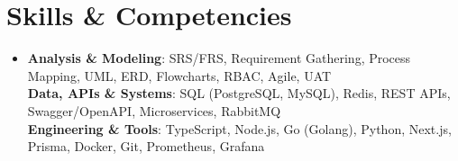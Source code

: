 \documentclass[letterpaper,11pt]{article}
\begin{document}
\section{Skills \& Competencies}
  \begin{itemize}[leftmargin=0in, label={}, itemsep=0.3pt, parsep=0pt, topsep=0.1pt]
    \item\small{
      \textbf{Analysis \& Modeling}{: SRS/FRS, Requirement Gathering, Process Mapping, UML, ERD, Flowcharts, RBAC, Agile, UAT} \\
      \textbf{Data, APIs \& Systems}{: SQL (PostgreSQL, MySQL), Redis, REST APIs, Swagger/OpenAPI, Microservices, RabbitMQ} \\
      \textbf{Engineering \& Tools}{: TypeScript, Node.js, Go (Golang), Python, Next.js, Prisma, Docker, Git, Prometheus, Grafana}
    }
  \end{itemize}
\end{document}
